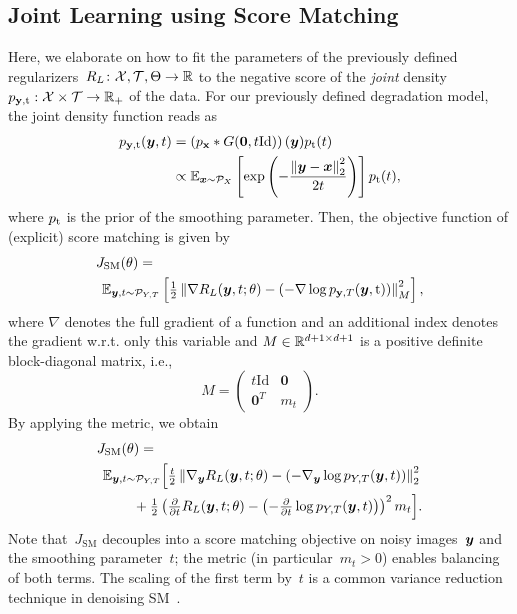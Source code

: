 \documentclass{article}
\newcommand{\X}{\mathcal{X}}
\newcommand{\T}{\mathcal{T}}
\newcommand{\id}{\mathrm{Id}}
\newcommand{\norm}[1]{\left\Vert#1\right\Vert}
\renewcommand{\vec}[1]{\mathbf{#1}}
\newcommand{\dist}[1]{\mathcal{P}_{#1}}
\newcommand{\pdf}[1]{p_{#1}}
\theoremstyle{plain}
\theoremstyle{definition}
\theoremstyle{remark}
\begin{document}
\subsection{Joint Learning using Score Matching}
Here, we elaborate on how to fit the parameters of the previously defined regularizers~$R_L\colon\X,\T,\Theta\to\R$ to the negative score of the \emph{joint} density~$\pdf{\rvy,\rt}:\X\times\T\to\R_+$ of the data.
For our previously defined degradation model, the joint density function reads as
\begin{align*}
\pdf{\rvy,\rt}(\vy,t) &= \left(\pdf{\rvx}\ast G(\vec{0},t\id)\right)(\vy) \pdf{\rt}(t)\\
&\propto \E_{\vx\sim\dist{X}}\left[\exp\left(-\frac{\norm{\vy-\vx}_2^2}{2 t}\right)\right] \pdf{\rt}(t),
\end{align*}
where $\pdf{\rt}$ is the prior of the smoothing parameter.
Then, the objective function of (explicit) score matching is given by
\begin{align} \label{eq:jsm}
&J_\mathrm{SM}(\theta) = \\
&\hspace{1ex}\E_{\vy,t\sim\dist{Y,T}}\left[\tfrac12\norm{\nabla R_L(\vy,t;\theta) -\left(- \nabla\log p_{\rvy,T}(\vy,\rt)\right)}_M^2\right], \notag
\end{align}
where $\nabla$ denotes the full gradient of a function and an additional index denotes the gradient w.r.t. only this variable and 
$M\in\mathbb{R}^{d+1\times d+1}$ is a positive definite block-diagonal matrix, i.e.,
\[
M = \begin{pmatrix}
t\id & \vec{0} \\
\vec{0}^T & m_t
\end{pmatrix}.
\]
By applying the metric, we obtain
\begin{align}\label{eq:jsmParts}
&J_\mathrm{SM}(\theta)=\\
&\hspace{1ex}\E_{\vy,t\sim\dist{Y,T}}\Big[\tfrac{t}{2}\norm{\nabla_\vy R_L(\vy,t;\theta) -\left(- \nabla_\vy\log p_{Y,T}(\vy,t)\right)}_2^2 \notag\\
&\hspace{6ex}+\tfrac12\left(\tfrac{\partial}{\partial t}R_L(\vy,t;\theta) -\left(-\tfrac{\partial}{\partial t}\log p_{Y,T}(\vy,t)\right)\right)^2m_t\Big].\notag
\end{align}
Note that~$J_\mathrm{SM}$ decouples into a score matching objective on noisy images~${\bm{y}}$ and the smoothing parameter~$t$; the metric (in particular~$m_t>0$) enables balancing of both terms.
The scaling of the first term by~$t$ is a common variance reduction technique in denoising SM~\citep{SoEr19,HuLi21}.
\end{document}
